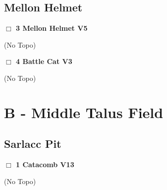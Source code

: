 \begin{multicols}{2}
\needspace{10em}
\subsection*{Mellon Helmet}\label{bf:Mellon Helmet}




\needspace{2em}
\label{rt:Mellon Helmet}
\colorbox{RoyalBlue!20}{
\parbox{0.95\linewidth}{
\hspace{-1ex}\textbf{$\Box$
3 Mellon Helmet V5  
}}}
\begin{adjustwidth}{1.3em}{}			


  (No Topo)
\end{adjustwidth}




\needspace{2em}
\label{rt:Battle Cat}
\colorbox{green!20}{
\parbox{0.95\linewidth}{
\hspace{-1ex}\textbf{$\Box$
4 Battle Cat V3  
}}}
\begin{adjustwidth}{1.3em}{}			


  (No Topo)
\end{adjustwidth}





\newpage

\section{B - Middle Talus Field}\label{sa:Middle Talus Field}





\needspace{10em}
\subsection*{Sarlacc Pit}\label{bf:Sarlacc Pit}




\needspace{2em}
\label{rt:Catacomb}
\colorbox{red!20}{
\parbox{0.95\linewidth}{
\hspace{-1ex}\textbf{$\Box$
1 Catacomb V13  
}}}
\begin{adjustwidth}{1.3em}{}			


  (No Topo)
\end{adjustwidth}






\end{multicols}
\clearpage